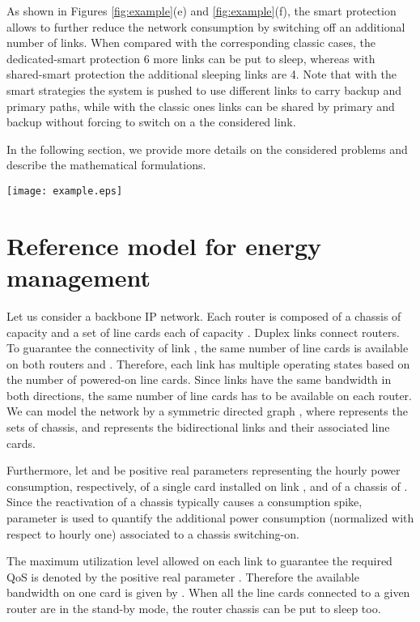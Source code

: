 \documentclass[final,5p,times,twocolumn]{elsarticle}
\begin{document}
As shown in Figures \ref{fig:example}(e) and \ref{fig:example}(f), the smart protection allows to further reduce the network consumption by switching off an additional number of links. 
When compared with the corresponding classic cases, the dedicated-smart protection 6 more links can be put to sleep, whereas with shared-smart protection the additional sleeping links are 4. Note that with the smart strategies the system is pushed to use different links to carry backup and primary paths, while with the classic ones links can be shared by primary and backup without forcing to switch on a the considered link.   
 
In the following section, we provide more details on the considered problems and describe the mathematical formulations.

\begin{figure*}[!p]\centering
  \texttt{[image: example.eps]}
  \caption{Energy consumption minimization vs Resilience requirements.}
\label{fig:example}
\end{figure*}




\section{Reference model for energy management}\label{sec:formulation}

Let us consider a backbone IP network. Each router is composed of a chassis of capacity  and a set of line cards each of capacity . Duplex links connect routers. To guarantee the  connectivity of link , the same number  of line cards is available on both routers  and . Therefore, each link has multiple operating states based on the number of powered-on line cards. Since links have the same bandwidth in both directions, the same number of line cards has to be available on each router.
We can model the network by a symmetric directed graph , where  represents the sets of chassis, and  represents the bidirectional links and their associated line cards.

Furthermore, let  and  be positive real parameters representing the hourly power consumption, respectively, of a single card installed on link , and of a chassis of . Since the reactivation of a chassis typically causes a consumption spike, parameter  is used to quantify the additional power consumption (normalized with respect to hourly one) associated to a chassis switching-on.

The maximum utilization level allowed on each link to guarantee the required QoS is denoted by the positive real parameter . Therefore the available bandwidth on one card is given by . When all the line cards connected to a given router are in the stand-by mode, the router chassis can be put to sleep too.  
\end{document}
